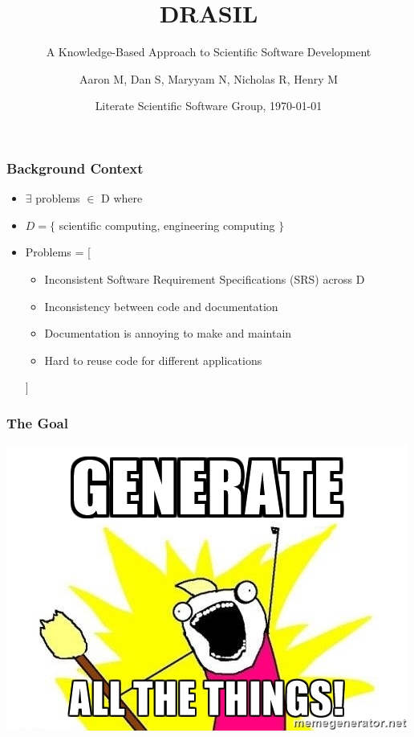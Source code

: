 \documentclass{beamer}
\title{DRASIL}
\subtitle{A Knowledge-Based Approach to Scientific Software Development}
\author{Aaron M, Dan S, Maryyam N, Nicholas R, Henry M}
\institute{McMaster University}
\date[LSS \today]{Literate Scientific Software Group, \today}
\begin{document}
\frame{\titlepage}

\begin{frame}
\frametitle{Background Context}
\begin{itemize}
 \item $\exists$ problems $\in$ D where
 \item $D = \{$ scientific computing, engineering computing $\}$
 \item Problems = [\\ 
  \begin{itemize}
   \item Inconsistent Software Requirement Specifications (SRS) across D
   \item Inconsistency between code and documentation
   \item Documentation is annoying to make and maintain
   \item Hard to reuse code for different applications
  \end{itemize}
 ]
\end{itemize}
\end{frame}

\begin{frame}
\frametitle{The Goal}
\includegraphics[scale=0.70]{../WG2_11/generate_all_the_things.jpg}
\end{frame}
\end{document}
